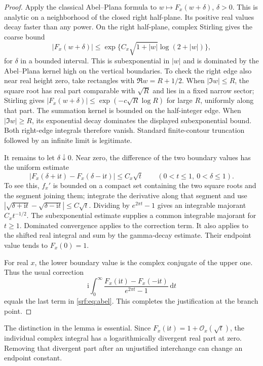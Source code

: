 \documentclass[11pt]{article}
\theoremstyle{remark}\newtheorem{remark}[theorem]{Remark}
\newcommand{\OO}{\mathcal O}
\newcommand{\ii}{\mathrm i}
\newcommand{\dd}{\,\mathrm d}
\begin{document}
\begin{proof}
Apply the classical Abel--Plana formula \cite[Section 2.10]{dlmfap} to $w\mapsto F_x(w+\delta)$, $\delta>0$. This is analytic on a neighborhood of the closed right half-plane. Its positive real values decay faster than any power. On the right half-plane, complex Stirling gives the coarse bound
\[
 |F_x(w+\delta)|\le
 \exp\{C_x\sqrt{1+|w|}\log(2+|w|)\},
\]
for $\delta$ in a bounded interval. This is subexponential in $|w|$ and is dominated by the Abel--Plana kernel high on the vertical boundaries. To check the right edge also near real height zero, take rectangles with $\Re w=R+1/2$. When $|\Im w|\le R$, the square root has real part comparable with $\sqrt R$ and lies in a fixed narrow sector; Stirling gives $|F_x(w+\delta)|\le\exp(-c\sqrt R\log R)$ for large $R$, uniformly along that part. The summation kernel is bounded on the half-integer edge. When $|\Im w|\ge R$, its exponential decay dominates the displayed subexponential bound. Both right-edge integrals therefore vanish. Standard finite-contour truncation followed by an infinite limit is legitimate.

It remains to let $\delta\downarrow0$. Near zero, the difference of the two boundary values has the uniform estimate
\[
 |F_x(\delta+\ii t)-F_x(\delta-\ii t)|
       \le C_x\sqrt t\qquad(0<t\le1,\ 0<\delta\le1).
\]
To see this, $f_x'$ is bounded on a compact set containing the two square roots and the segment joining them; integrate the derivative along that segment and use
$|\sqrt{\delta+\ii t}-\sqrt{\delta-\ii t}|\le C\sqrt t$. Dividing by $e^{2\pi t}-1$ gives an integrable majorant $C_xt^{-1/2}$. The subexponential estimate supplies a common integrable majorant for $t\ge1$. Dominated convergence applies to the correction term. It also applies to the shifted real integral and sum by the gamma-decay estimate. Their endpoint value tends to $F_x(0)=1$.

For real $x$, the lower boundary value is the complex conjugate of the upper one. Thus the usual correction
\[
 \ii\int_0^\infty
 \frac{F_x(\ii t)-F_x(-\ii t)}{e^{2\pi t}-1}\dd t
\]
equals the last term in \eqref{srf:eq:abel}. This completes the justification at the branch point.
\end{proof}

The distinction in the lemma is essential. Since $F_x(\ii t)=1+\OO_x(\sqrt t)$, the individual complex integral has a logarithmically divergent real part at zero. Removing that divergent part after an unjustified interchange can change an endpoint constant.
\end{document}
